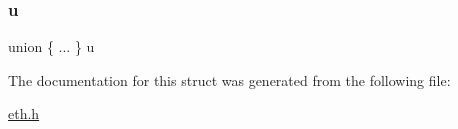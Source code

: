 \hypertarget{structeth__rx__head_afd2ca263ad0806cca0d771e2f2671750}{}\label{structeth__rx__head_afd2ca263ad0806cca0d771e2f2671750} 
\subsubsection{\texorpdfstring{u}{u}}
{\footnotesize\ttfamily union \{ ... \}   u}



The documentation for this struct was generated from the following file\+:\begin{DoxyCompactItemize}
\item 
\hyperlink{eth_8h}{eth.\+h}\end{DoxyCompactItemize}
